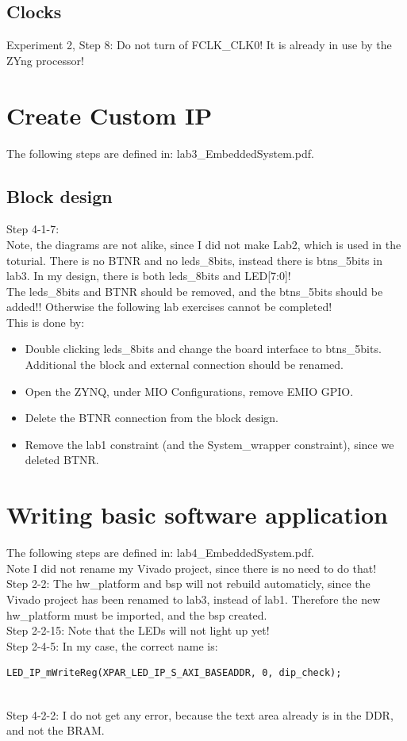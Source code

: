 \documentclass[]{report}
\begin{document}
\section{Clocks}
Experiment 2, Step 8: Do not turn of FCLK\_CLK0! It is already in use by the ZYng processor!

\chapter{Create Custom IP}
The following steps are defined in: lab3\_EmbeddedSystem.pdf.
\section{Block design}
Step 4-1-7:\\
Note, the diagrams are not alike, since I did not make Lab2, which is used in the toturial.
There is no BTNR and no leds\_8bits, instead there is btns\_5bits in lab3.
In my design, there is both leds\_8bits and LED[7:0]!\\
The leds\_8bits and BTNR should be removed, and the btns\_5bits should be added!! Otherwise the following lab exercises cannot be completed!\\
This is done by:
\begin{itemize}
	\item Double clicking leds\_8bits and change the board interface to btns\_5bits. Additional the block and external connection should be renamed.
	\item Open the ZYNQ, under MIO Configurations, remove EMIO GPIO.
	\item Delete the BTNR connection from the block design.
	\item Remove the lab1 constraint (and the System\_wrapper constraint), since we deleted BTNR.
\end{itemize}


\chapter{Writing basic software application}
The following steps are defined in: lab4\_EmbeddedSystem.pdf.\\
Note I did not rename my Vivado project, since there is no need to do that!
\newline
\\
Step 2-2: The hw\_platform and bsp will not rebuild automaticly, since the Vivado project has been renamed to lab3, instead of lab1.
Therefore the new hw\_platform must be imported, and the bsp created.
\newline
\\
Step 2-2-15: Note that the LEDs will not light up yet!
\newline
\\
Step 2-4-5: In my case, the correct name is:
\begin{lstlisting}
LED_IP_mWriteReg(XPAR_LED_IP_S_AXI_BASEADDR, 0, dip_check);
\end{lstlisting}
\newline
\\
Step 4-2-2: I do not get any error, because the text area already is in the DDR, and not the BRAM.
\end{document}
